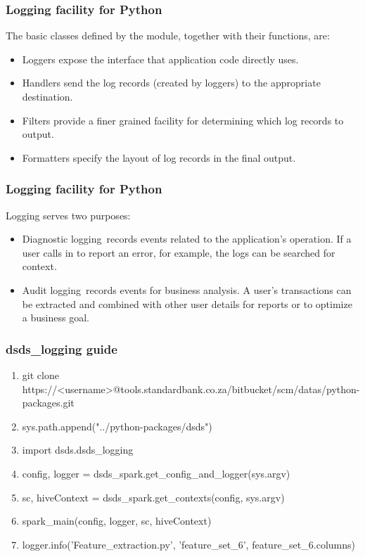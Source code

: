 \documentclass[11pt]{beamer}
\begin{document}
\begin{frame}
\frametitle{Logging facility for Python}
The basic classes defined by the module, together with their functions, are:
\begin{itemize}
	\item Loggers expose the interface that application code directly uses.
	\item Handlers send the log records (created by loggers) to the appropriate destination.
	\item Filters provide a finer grained facility for determining which log records to output.
	\item Formatters specify the layout of log records in the final output.
\end{itemize}
\end{frame}

\begin{frame}
\frametitle{Logging facility for Python}
Logging serves two purposes:
\begin{itemize}
	\item Diagnostic logging records events related to the application’s operation. If a user calls in to report an error, for example, the logs can be searched for context.
	\item Audit logging records events for business analysis. A user’s transactions can be extracted and combined with other user details for reports or to optimize a business goal.
\end{itemize}
\end{frame}


\begin{frame}
\frametitle{dsds\_logging guide}
\begin{enumerate}
	\item git clone https://<username>@tools.standardbank.co.za/bitbucket/scm/datas/python-packages.git
	\item sys.path.append("../python-packages/dsds")
	\item import dsds.dsds\_logging
	\item config, logger = dsds\_spark.get\_config\_and\_logger(sys.argv)
	\item sc, hiveContext = dsds\_spark.get\_contexts(config, sys.argv)
	\item spark\_main(config, logger, sc, hiveContext)
	\item logger.info('Feature\_extraction.py', 'feature\_set\_6', feature\_set\_6.columns)
\end{enumerate}
\end{frame}
\end{document}
